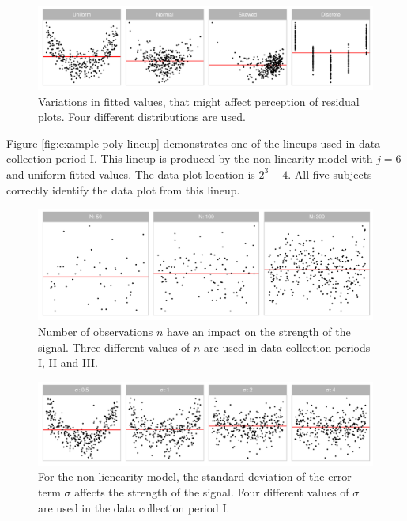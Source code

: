 \documentclass[]{interact}
\theoremstyle{plain}%
\theoremstyle{definition}
\theoremstyle{remark}
\begin{document}
\begin{figure}

{\centering \includegraphics[width=1\linewidth]{paper_comparison_files/figure-latex/different-dist-1} 

}

\caption{Variations in fitted values, that might affect perception of residual plots. Four different distributions are used.}\label{fig:different-dist}
\end{figure}

Figure \ref{fig:example-poly-lineup} demonstrates one of the lineups
used in data collection period I. This lineup is produced by the
non-linearity model with \(j = 6\) and uniform fitted values. The data
plot location is \(2^3 - 4\). All five subjects correctly identify the
data plot from this lineup.

\begin{figure}

{\centering \includegraphics[width=1\linewidth]{paper_comparison_files/figure-latex/different-n-1} 

}

\caption{Number of observations $n$ have an impact on the strength of the signal. Three different values of $n$ are used in data collection periods I, II and III.}\label{fig:different-n}
\end{figure}

\begin{figure}

{\centering \includegraphics[width=1\linewidth]{paper_comparison_files/figure-latex/different-sigma-1} 

}

\caption{For the non-lienearity model, the standard deviation of the error term $\sigma$ affects the strength of the signal. Four different values of $\sigma$ are used in the data collection period I.}\label{fig:different-sigma}
\end{figure}
\end{document}
